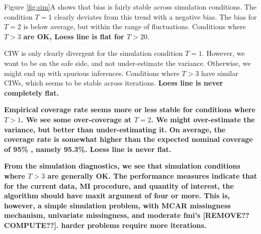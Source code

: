 \documentclass[article]{jss}
\begin{document}
Figure \ref{fig:sim}A shows that bias is fairly stable across simulation conditions. The condition $T=1$ clearly deviates from this trend with a negative bias. The bias for $T=2$ is below average, but within the range of fluctuations. Conditions where $T>3$ \textbf{are OK, Loess line is flat for $T>20$}.  

CIW is only clearly divergent for the simulation condition $T=1$. However, we want to be on the safe side, and not under-estimate the variance. Otherwise, we might end up with spurious inferences. Conditions where $T>3$ have similar CIWs, which seems to be stable across iterations. \textbf{Loess line is never completely flat.}%

\textbf{Empirical coverage rate seems more or less stable for conditions where $T>1$. We see some over-coverage at $T=2$. We might over-estimate the variance, but better than under-estimating it. On average, the coverage rate is somewhat higher than the expected nominal coverage of 95\% \citep{neym34}, namely 95.3\%. Loess line is never flat.}

\textbf{From the simulation diagnostics, we see that simulation conditions where $T>3$ are generally OK. The performance measures indicate that for the current data, MI procedure, and quantity of interest, the algorithm should have maxit argument of four or more. This is, however, a simple simulation problem, with MCAR missingness mechanism, univariate missingness, and moderate fmi's [REMOVE?? COMPUTE??]. harder problems require more iterations.} %
\end{document}
